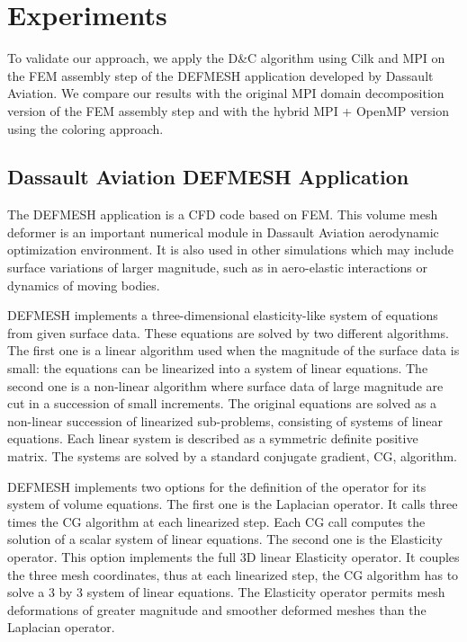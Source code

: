 \documentclass[10pt]{IOS-Book-Article}
\begin{document}

\section{Experiments}
\label{sec:exp}
To validate our approach, we apply the D\&C algorithm using Cilk and MPI on the FEM assembly step of the DEFMESH application developed by Dassault Aviation.
We compare our results with the original MPI domain decomposition version of the FEM assembly step and with the hybrid MPI + OpenMP version using the coloring approach.

\subsection{Dassault Aviation DEFMESH Application}
The DEFMESH application is a CFD code based on FEM.
This volume mesh deformer is an important numerical module in Dassault Aviation aerodynamic optimization environment.
It is also used in other simulations which may include surface variations of larger magnitude, such as in aero-elastic interactions or dynamics of moving bodies.

DEFMESH implements a three-dimensional elasticity-like system of equations from given surface data.
These equations are solved by two different algorithms.
The first one is a linear algorithm used when the magnitude of the surface data is small: the equations can be linearized into a system of linear equations.
The second one is a non-linear algorithm where surface data of large magnitude are cut in a succession of small increments.
The original equations are solved as a non-linear succession of linearized sub-problems, consisting of systems of linear equations.
Each linear system is described as a symmetric definite positive matrix.
The systems are solved by a standard conjugate gradient, CG, algorithm.

DEFMESH implements two options for the definition of the operator for its system of volume equations.
The first one is the Laplacian operator. It calls three times the CG algorithm at each linearized step.
Each CG call computes the solution of a scalar system of linear equations.
The second one is the Elasticity operator. This option implements the full 3D linear Elasticity operator.
It couples the three mesh coordinates, thus at each linearized step, the CG algorithm has to solve a 3 by 3 system of linear equations.
The Elasticity operator permits mesh deformations of greater magnitude and smoother deformed meshes than the Laplacian operator.
\end{document}
